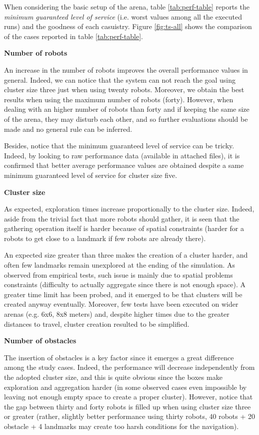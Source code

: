 When considering the basic setup of the arena, table \ref{tab:perf-table} reports the \textit{minimum guaranteed level of service} (i.e. worst values among all the executed runs) and the goodness of each casuistry. Figure \ref{fig:ts-all} shows the comparison of the cases reported in table \ref{tab:perf-table}.

\bigskip
\noindent
\textbf{Number of robots}

An increase in the number of robots improves the overall performance values in general. 
Indeed, we can notice that the system can not reach the goal using cluster size three just when using twenty robots. Moreover, we obtain the best results when using the maximum number of robots (forty).
However, when dealing with an higher number of robots than forty and if keeping the same size of the arena, they may disturb each other, and so further evaluations should be made and no general rule can be inferred. 

Besides, notice that the minimum guaranteed level of service can be tricky. Indeed, by looking to raw performance data (available in attached files), it is confirmed that better average performance values are obtained despite a same minimum guaranteed level of service for cluster size five.

\bigskip
\noindent
\textbf{Cluster size}

As expected, exploration times increase proportionally to the cluster size. Indeed, aside from the trivial fact that more robots should gather, it is seen that the gathering operation itself is harder because of spatial constraints (harder for a robots to get close to a landmark if few robots are already there).

\noindent
An expected size greater than three makes the creation of a cluster harder, and often few landmarks remain unexplored at the ending of the simulation. As observed from empirical tests, such issue is mainly due to spatial problems constraints (difficulty to actually aggregate since there is not enough space). A greater time limit has been probed, and it emerged to be that clusters will be created anyway eventually. Moreover, few tests have been executed on wider arenas (e.g. 6x6, 8x8 meters) and, despite higher times due to the greater distances to travel, cluster creation resulted to be simplified.

\bigskip
\noindent
\textbf{Number of obstacles}

The insertion of obstacles is a key factor since it emerges a great difference among the study cases. Indeed, the performance will decrease independently from the adopted cluster size, and this is quite obvious since the boxes make exploration and aggregation harder (in some observed cases even impossible by leaving not enough empty space to create a proper cluster). However, notice that the gap between thirty and forty robots is filled up when using cluster size three or greater (rather, slightly better performance using thirty robots, 40 robots + 20 obstacle + 4 landmarks may create too harsh conditions for the navigation).

